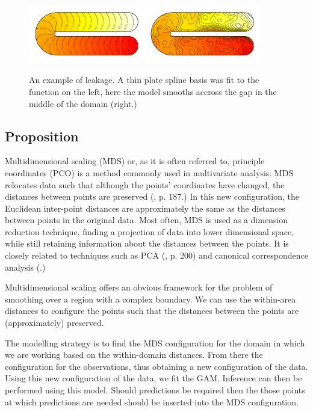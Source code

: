 \documentclass[a4paper,10pt]{article}
\begin{document}
\begin{figure}
\centering
\includegraphics[width=4in]{figs/ramsay-leak.pdf}\\
\caption{An example of leakage. A thin plate spline basis was fit to the function on the left, here the model smooths accross the gap in the middle of the domain (right.)}
\label{leakage}
\end{figure}


\subsection{Proposition}

Multidimensional scaling (MDS) or, as it is often referred to, principle coordinates (PCO) is a method commonly used in multivariate analysis. MDS relocates data such that although the points' coordinates have changed, the distances between points are preserved (\cite{chatfieldcollins}, p. 187.) In this new configuration, the Euclidean inter-point distances are approximately the same as the distances between points in the original data. Most often, MDS is used as a dimension reduction technique, finding a projection of data into lower dimensional space, while still retaining information about the distances between the points. It is closely related to techniques such as PCA (\cite{chatfieldcollins}, p. 200) and canonical correspondence analysis (\cite{terbraak}.)

Multidimensional scaling offers an obvious framework for the problem of smoothing over a region with a complex boundary. We can use the within-area distances to configure the points such that the distances between the points are (approximately) preserved.

The modelling strategy is to find the MDS configuration for the domain in which we are working based on the within-domain distances. From there the configuration for the observations, thus obtaining a new configuration of the data. Using this new configuration of the data, we fit the GAM. Inference can then be performed using this model. Should predictions be required then the those points at which predictions are needed should be inserted into the MDS configuration.
\end{document}
